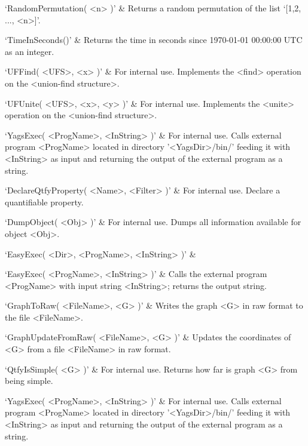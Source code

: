`RandomPermutation( <n> )' & 
Returns a random permutation of the list `[1,2, ..., <n>]'.

`TimeInSeconds()' & 
Returns the time in seconds since 1970-01-01 00:00:00 UTC as an integer.

`UFFind( <UFS>, <x> )' & 
For  internal  use.  Implements  the  <find>  operation on the <union-find structure>. 

`UFUnite( <UFS>, <x>, <y> )' & 
For  internal  use.  Implements  the  <unite> operation on the <union-find structure>.

`YagsExec( <ProgName>, <InString> )' & 
For  internal  use.  Calls  external  program  <ProgName> located in directory
'<YagsDir>/bin/'  feeding  it with <InString> as input and returning  the
output  of  the  external  program  as a string.
\enditems


\beginitems
`DeclareQtfyProperty( <Name>, <Filter> )' & 
For internal use. Declare a quantifiable property.

`DumpObject( <Obj> )' & 
For internal use. Dumps  all information available for object <Obj>.

`EasyExec( <Dir>, <ProgName>, <InString> )' & 

`EasyExec( <ProgName>, <InString> )' & 
Calls the external program <ProgName> with input string <InString>; returns the output string.

`GraphToRaw( <FileName>, <G> )' & 
Writes the graph <G> in raw format to the file  <FileName>.

`GraphUpdateFromRaw( <FileName>, <G> )' & 
Updates  the  coordinates  of  <G>  from  a file <FileName> in raw format.

`QtfyIsSimple( <G> )' & 
For internal use. Returns how far is graph <G> from being simple.

`YagsExec( <ProgName>, <InString> )' & 
For  internal  use.  Calls  external  program  <ProgName> located in directory
'<YagsDir>/bin/'  feeding  it with <InString> as input and returning  the
output  of  the  external  program  as a string.
\enditems

%
%
%
%


